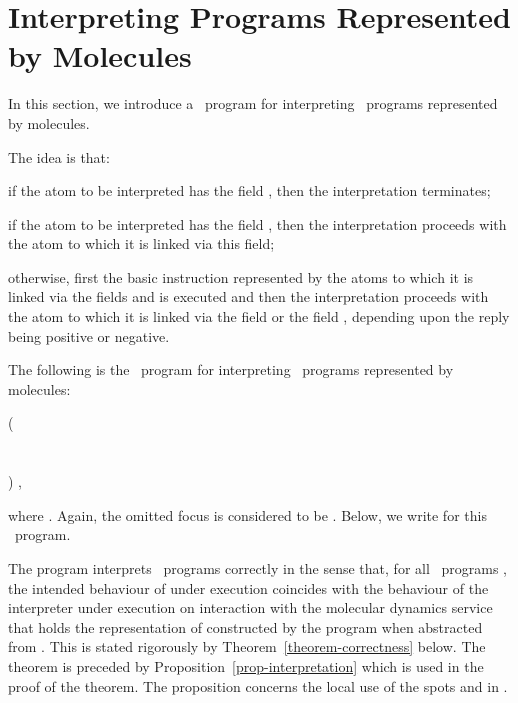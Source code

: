 \documentclass[fleqn]{llncs}
\begin{document}
\section{Interpreting Programs Represented by Molecules}
\label{sect-interpretation}

In this section, we introduce a \PGA\ program for interpreting \PGLD\
programs represented by molecules.

The idea is that:
\begin{iteml}
\item
if the atom to be interpreted has the field , then the
interpretation terminates;
\item
if the atom to be interpreted has the field , then the
interpretation proceeds with the atom to which it is linked via this
field;
\item
otherwise, first the basic instruction represented by the atoms to which it
is linked via the fields  and  is executed and then
the interpretation proceeds with the atom to which it is linked via the
field  or the field , depending upon the reply being
positive or negative.
\end{iteml}

The following is the \PGA\ program for interpreting \PGLD\ programs
represented by molecules:
\begin{ldispl}
\begin{aeqns}
( \conc \halt \conc
{} \\ \phantom{(}
  \conc {} \conc
{} \\ \phantom{(}
  \conc {} \conc
  \conc {} \conc
   \conc {} \conc
   \conc {} \conc
{} \\ \phantom{(}
 ) \rep\;,
\end{aeqns}
\end{ldispl}
where .
Again, the omitted focus is considered to be .
Below, we write  for this \PGA\ program.

The program  interprets \PGLD\ programs correctly in the sense that,
for all \PGLD\ programs , the intended behaviour of  under
execution coincides with the behaviour of the interpreter under
execution on interaction with the molecular dynamics service that holds
the representation of  constructed by the program  when
abstracted from .
This is stated rigorously by Theorem~\ref{theorem-correctness} below.
The theorem is preceded by Proposition~\ref{prop-interpretation} which is
used in the proof of the theorem.
The proposition concerns the local use of the spots  and  in .
\end{document}

